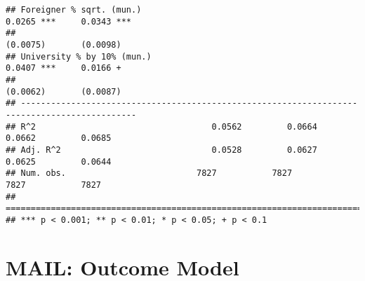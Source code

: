 \documentclass[
]{article}
\begin{document}
\begin{verbatim}
## Foreigner % sqrt. (mun.)                                            0.0265 ***     0.0343 ***
##                                                                    (0.0075)       (0.0098)   
## University % by 10% (mun.)                                          0.0407 ***     0.0166 +  
##                                                                    (0.0062)       (0.0087)   
## ---------------------------------------------------------------------------------------------
## R^2                                   0.0562         0.0664         0.0662         0.0685    
## Adj. R^2                              0.0528         0.0627         0.0625         0.0644    
## Num. obs.                          7827           7827           7827           7827         
## =============================================================================================
## *** p < 0.001; ** p < 0.01; * p < 0.05; + p < 0.1
\end{verbatim}

\hypertarget{mail-outcome-model}{%
\section{MAIL: Outcome Model}\label{mail-outcome-model}}
\end{document}
